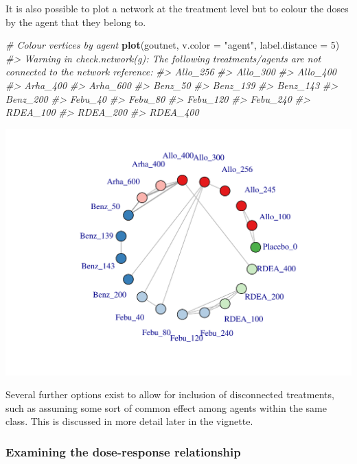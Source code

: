 \documentclass[]{article}
\newenvironment{Shaded}{\begin{snugshade}}{\end{snugshade}}
\newcommand{\CommentTok}[1]{\textcolor[rgb]{0.56,0.35,0.01}{\textit{#1}}}
\newcommand{\DataTypeTok}[1]{\textcolor[rgb]{0.13,0.29,0.53}{#1}}
\newcommand{\DecValTok}[1]{\textcolor[rgb]{0.00,0.00,0.81}{#1}}
\newcommand{\KeywordTok}[1]{\textcolor[rgb]{0.13,0.29,0.53}{\textbf{#1}}}
\newcommand{\NormalTok}[1]{#1}
\newcommand{\StringTok}[1]{\textcolor[rgb]{0.31,0.60,0.02}{#1}}
\begin{document}
It is also possible to plot a network at the treatment level but to
colour the doses by the agent that they belong to.

\begin{Shaded}
\begin{Highlighting}[]
\CommentTok{# Colour vertices by agent}
\KeywordTok{plot}\NormalTok{(goutnet, }\DataTypeTok{v.color =} \StringTok{"agent"}\NormalTok{, }\DataTypeTok{label.distance =} \DecValTok{5}\NormalTok{)}
\CommentTok{#> Warning in check.network(g): The following treatments/agents are not connected to the network reference:}
\CommentTok{#> Allo_256}
\CommentTok{#> Allo_300}
\CommentTok{#> Allo_400}
\CommentTok{#> Arha_400}
\CommentTok{#> Arha_600}
\CommentTok{#> Benz_50}
\CommentTok{#> Benz_139}
\CommentTok{#> Benz_143}
\CommentTok{#> Benz_200}
\CommentTok{#> Febu_40}
\CommentTok{#> Febu_80}
\CommentTok{#> Febu_120}
\CommentTok{#> Febu_240}
\CommentTok{#> RDEA_100}
\CommentTok{#> RDEA_200}
\CommentTok{#> RDEA_400}
\end{Highlighting}
\end{Shaded}

\includegraphics{mbnmadose_files/figure-latex/unnamed-chunk-11-1.pdf}

Several further options exist to allow for inclusion of disconnected
treatments, such as assuming some sort of common effect among agents
within the same class. This is discussed in more detail later in the
vignette.

\hypertarget{examining-the-dose-response-relationship}{%
\subsubsection{Examining the dose-response
relationship}\label{examining-the-dose-response-relationship}}
\end{document}
